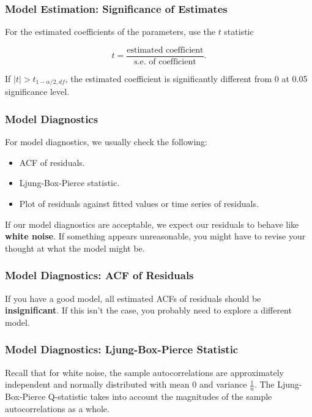 \documentclass[%
xcolor=pdftex]{beamer}
\begin{document}
\begin{frame}
\frametitle{Model Estimation: Significance of Estimates}

For the estimated coefficients of the parameters, use the $t$ statistic

$$
t = \frac{\mbox{estimated coefficient}}{\mbox{s.e. of coefficient}}.
$$

If $|t| > t_{1 - \alpha/2, df}$, the estimated coefficient is significantly different from 0 at 0.05 significance level.

\end{frame}



\begin{frame}
\frametitle{Model Diagnostics}

For model diagnostics, we usually check the following:

\begin{itemize}
\item ACF of residuals.
\item Ljung-Box-Pierce statistic.
\item Plot of residuals against fitted values or time series of residuals.
\end{itemize}

If our model diagnostics are acceptable, we expect our residuals to behave like \textbf{white noise}. If something appears unreasonable, you might have to revise your thought at what the model might be.

\end{frame}

\begin{frame}
\frametitle{Model Diagnostics: ACF of Residuals}

If you have a good model, all estimated ACFs of residuals should be \textbf{insignificant}. If this isn't the case, you probably need to explore a different model.

\end{frame}


\begin{frame}
\frametitle{Model Diagnostics: Ljung-Box-Pierce Statistic}

Recall that for white noise, the sample autocorrelations are approximately independent and normally distributed with mean 0 and variance $\frac{1}{n}$. The Ljung-Box-Pierce Q-statistic takes into account the magnitudes of the sample autocorrelations as a whole.

\end{frame}
\end{document}
